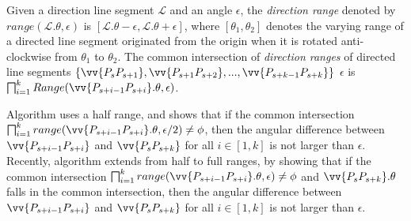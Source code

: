 %
Given a direction line segment $\mathcal{L}$ and an angle $\epsilon$, the \emph{direction range} denoted by $range(\mathcal{L}.\theta, \epsilon)$ is $[\mathcal{L}.\theta-\epsilon, \mathcal{L}.\theta+\epsilon]$, where $[\theta_1, \theta_2]$ denotes the varying range of a directed line segment originated from the origin when it is rotated anti-clockwise from $\theta_1$ to $\theta_2$.
%
The {common intersection} of \emph{direction ranges} of directed line segments $\{\vv{P_sP_{s+1}}, \vv{P_{s+1}P_{s+2}}, ..., \vv{P_{s+k-1}P_{s+k}}\}$ \wrt $\epsilon$ is $\bigsqcap_{i=1}^{k}Range(\vv{P_{s+i-1} P_{s+i}}.\theta, \epsilon)$.

Algorithm \intersec\cite{Long:Direction} uses a half range, and shows that if the {common intersection} $\bigsqcap_{i=1}^{k}range(\vv{P_{s+i-1} P_{s+i}}.\theta, \epsilon/2)\ne \phi$, then the angular difference between $\vv{P_{s+i-1}P_{s+i}}$ and $\vv{P_sP_{s+k}}$ for all $i\in [1, k]$ is not larger than $\epsilon$.
%
Recently, {algorithm \interval \cite{Ke:Interval} extends} \intersec from half to full ranges, by showing that if the {common intersection} $\bigsqcap_{i=1}^{k}range(\vv{P_{s+i-1} P_{s+i}}.\theta, \epsilon)\ne \phi$ and $\vv{P_sP_{s+k}}.\theta$ falls in the {common intersection}, then the angular difference between $\vv{P_{s+i-1}P_{s+i}}$ and $\vv{P_sP_{s+k}}$ for all $i\in [1, k]$ is not larger than $\epsilon$.
%

